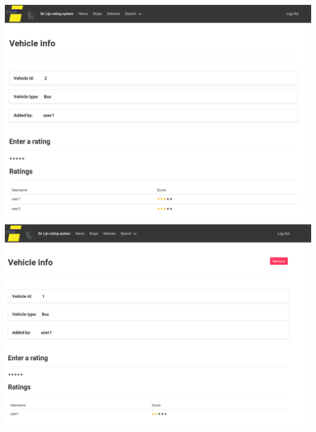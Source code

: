 \documentclass[12pt,a4paper]{article}
\begin{document}
\includegraphics[scale=0.3]{vehicleInfo}\\
\includegraphics[scale=0.3]{vehicleRemove}
 
\end{document}
